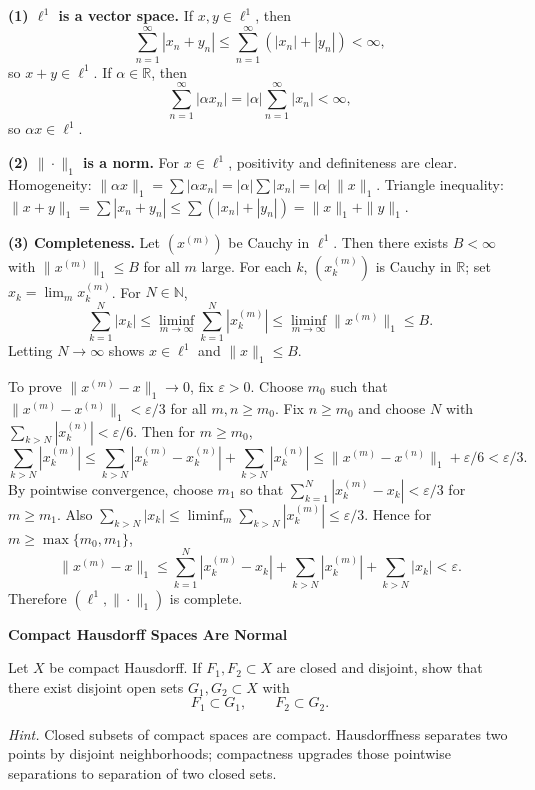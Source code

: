 \begin{solution}
\textbf{(1) $\ell^1$ is a vector space.}
If $x,y\in\ell^1$, then
\[
\sum_{n=1}^\infty |x_n+y_n|\le \sum_{n=1}^\infty (|x_n|+|y_n|)<\infty,
\]
so $x+y\in\ell^1$.
If $\alpha\in\mathbb{R}$, then
\[
\sum_{n=1}^\infty |\alpha x_n|=|\alpha|\sum_{n=1}^\infty |x_n|<\infty,
\]
so $\alpha x\in\ell^1$.

\textbf{(2) $\|\cdot\|_1$ is a norm.}
For $x\in\ell^1$, positivity and definiteness are clear.
Homogeneity:
$\|\alpha x\|_1=\sum|\alpha x_n|=|\alpha|\sum|x_n|=|\alpha|\,\|x\|_1$.
Triangle inequality:
$\|x+y\|_1=\sum|x_n+y_n|\le \sum(|x_n|+|y_n|)=\|x\|_1+\|y\|_1$.

\textbf{(3) Completeness.}
Let $(x^{(m)})$ be Cauchy in $\ell^1$.
Then there exists $B<\infty$ with $\|x^{(m)}\|_1\le B$ for all $m$ large.
For each $k$, $(x^{(m)}_k)$ is Cauchy in $\mathbb{R}$; set $x_k=\lim_m x^{(m)}_k$.
For $N\in\mathbb{N}$,
\[
\sum_{k=1}^N |x_k| \le \liminf_{m\to\infty} \sum_{k=1}^N |x^{(m)}_k|
\le \liminf_{m\to\infty} \|x^{(m)}\|_1 \le B.
\]
Letting $N\to\infty$ shows $x\in\ell^1$ and $\|x\|_1\le B$.

To prove $\|x^{(m)}-x\|_1\to 0$, fix $\varepsilon>0$.
Choose $m_0$ such that $\|x^{(m)}-x^{(n)}\|_1<\varepsilon/3$ for all $m,n\ge m_0$.
Fix $n\ge m_0$ and choose $N$ with $\sum_{k>N}|x^{(n)}_k|<\varepsilon/6$.
Then for $m\ge m_0$,
\[
\sum_{k>N}|x^{(m)}_k|
\le \sum_{k>N}|x^{(m)}_k-x^{(n)}_k| + \sum_{k>N}|x^{(n)}_k|
\le \|x^{(m)}-x^{(n)}\|_1 + \varepsilon/6 < \varepsilon/3.
\]
By pointwise convergence, choose $m_1$ so that $\sum_{k=1}^N |x^{(m)}_k-x_k|<\varepsilon/3$ for $m\ge m_1$.
Also $\sum_{k>N}|x_k|\le \liminf_{m}\sum_{k>N}|x^{(m)}_k|\le \varepsilon/3$.
Hence for $m\ge \max\{m_0,m_1\}$,
\[
\|x^{(m)}-x\|_1
\le \sum_{k=1}^N |x^{(m)}_k-x_k| + \sum_{k>N}|x^{(m)}_k| + \sum_{k>N}|x_k| < \varepsilon.
\]
Therefore $(\ell^1,\|\cdot\|_1)$ is complete.
\end{solution}

\begin{problem}[CP-II-0249]
\label{prob:cp-ii-0249}
\textbf{Compact Hausdorff Spaces Are Normal}

\hspace*{1.5em}Let \(X\) be compact Hausdorff. If \(F_1,F_2\subset X\) are closed and
disjoint, show that there exist disjoint open sets \(G_1,G_2\subset X\) with
\[
F_1\subset G_1,
\qquad
F_2\subset G_2.
\]

\medskip
\noindent\emph{Hint.} Closed subsets of compact spaces are compact. Hausdorffness separates two
points by disjoint neighborhoods; compactness upgrades those pointwise
separations to separation of two closed sets.
\end{problem}

